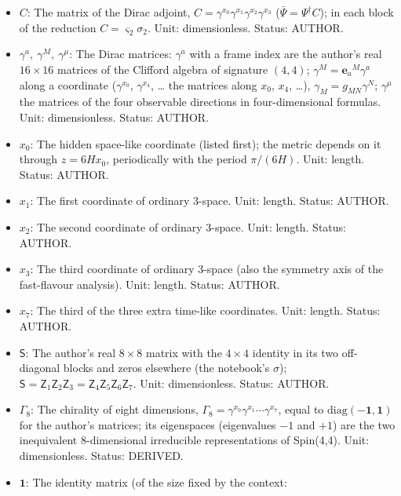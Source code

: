 \documentclass[
  10pt,
]{article}
\providecommand{\tightlist}{%
  \setlength{\itemsep}{0pt}\setlength{\parskip}{0pt}}
\begin{document}
\begin{itemize}
\tightlist
\item
  \(C\): The matrix of the Dirac adjoint,
  \(C = \gamma^{x_0}\gamma^{x_1}\gamma^{x_2}\gamma^{x_3}\)
  (\(\bar\Psi = \Psi^\dagger C\)); in each block of the reduction
  \(C = \varsigma_2\sigma_2\). Unit: dimensionless. Status: AUTHOR.
\item
  \(\gamma^a,\ \gamma^M,\ \gamma^\mu\): The Dirac matrices: \(\gamma^a\)
  with a frame index are the author's real \(16 \times 16\) matrices of
  the Clifford algebra of signature \((4, 4)\);
  \(\gamma^M = \mathbf{e}_a{}^M\gamma^a\) along a coordinate
  (\(\gamma^{x_0}\), \(\gamma^{x_4}\), \ldots{} the matrices along
  \(x_0\), \(x_4\), \ldots), \(\gamma_M = g_{MN}\gamma^N\);
  \(\gamma^\mu\) the matrices of the four observable directions in
  four-dimensional formulas. Unit: dimensionless. Status: AUTHOR.
\item
  \(x_0\): The hidden space-like coordinate (listed first); the metric
  depends on it through \(z = 6Hx_0\), periodically with the period
  \(\pi/(6H)\). Unit: length. Status: AUTHOR.
\item
  \(x_1\): The first coordinate of ordinary 3-space. Unit: length.
  Status: AUTHOR.
\item
  \(x_2\): The second coordinate of ordinary 3-space. Unit: length.
  Status: AUTHOR.
\item
  \(x_3\): The third coordinate of ordinary 3-space (also the symmetry
  axis of the fast-flavour analysis). Unit: length. Status: AUTHOR.
\item
  \(x_7\): The third of the three extra time-like coordinates. Unit:
  length. Status: AUTHOR.
\item
  \(\mathsf{S}\): The author's real \(8\times8\) matrix with the
  \(4\times4\) identity in its two off-diagonal blocks and zeros
  elsewhere (the notebook's \(\sigma\));
  \(\mathsf{S} = \mathsf{Z}_1\mathsf{Z}_2\mathsf{Z}_3 = \mathsf{Z}_4\mathsf{Z}_5\mathsf{Z}_6\mathsf{Z}_7\).
  Unit: dimensionless. Status: AUTHOR.
\item
  \(\Gamma_8\): The chirality of eight dimensions,
  \(\Gamma_8 = \gamma^{x_0}\gamma^{x_1}\cdots\gamma^{x_7}\), equal to
  \(\mathrm{diag}(-\mathbf{1}, \mathbf{1})\) for the author's matrices;
  its eigenspaces (eigenvalues \(-1\) and \(+1\)) are the two
  inequivalent 8-dimensional irreducible representations of Spin(4,4).
  Unit: dimensionless. Status: DERIVED.
\item
  \(\mathbf{1}\): The identity matrix (of the size fixed by the context:

\end{itemize}
\end{document}
